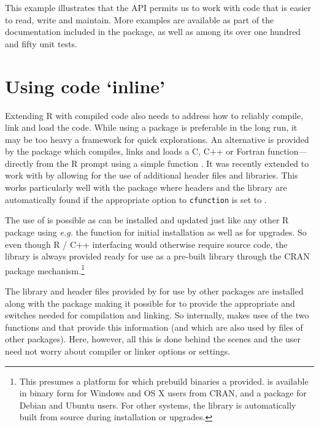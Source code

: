 This example illustrates that the  API permits us to work with code
that is easier to read, write and maintain. More examples are available as
part of the documentation included in the  package, as well as
among its over one hundred and fifty unit tests.


\section{Using code `inline'}
\label{sec:inline}

Extending R with compiled code also needs to address how to reliably compile,
link and load the code.  While using a package is preferable in the long run,
it may be too heavy a framework for quick explorations.
An alternative is
provided by the  package \citep{cran:inline} which compiles,
links and loads a C, C++ or Fortran function---directly from the R prompt
using a simple function .  It was recently extended to work
with  by allowing for the use of additional header files and
libraries. This works particularly well with the  package where
headers and the library are automatically found if the appropriate option
 to \texttt{cfunction} is set to .

The use of  is possible as  can be installed and
updated just like any other R package using \textsl{e.g.} the
 function for initial installation as well as
 for upgrades.  So even though R / C++ interfacing
would otherwise require source code, the  library is always provided
ready for use as a pre-built library through the CRAN package
mechanism.\footnote{This presumes a platform for which prebuild binaries a
  provided.  is available in binary form for Windows and OS X users from
  CRAN, and a  package for Debian and Ubuntu users. For other systems, the
   library is automatically built from source during installation
  or upgrades.}

The library and header files provided by  for use by other packages
are installed along with the  package making it possible for
 to provide the appropriate  and  switches needed
for compilation and linking.  So internally,  makes uses of the
two functions  and  that
provide this information (and which are also used by  files of
other packages).  Here, however, all this is done behind the scenes and the
user need not worry about compiler or linker options or settings.

